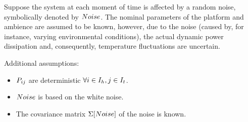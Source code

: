 Suppose the system at each moment of time is affected by a random noise, symbolically denoted by $Noise$. The nominal parameters of the platform and ambience are assumed to be known, however, due to the noise (caused by, for instance, varying environmental conditions), the actual dynamic power dissipation and, consequently, temperature fluctuations are uncertain.

Additional assumptions:
\begin{itemize}
  \item $P_{ij}$ are deterministic $\forall i \in I_h, j \in I_t$.
  \item $Noise$ is based on the white noise.
  \item The covariance matrix $\Sigma[Noise]$ of the noise is known.
\end{itemize}

